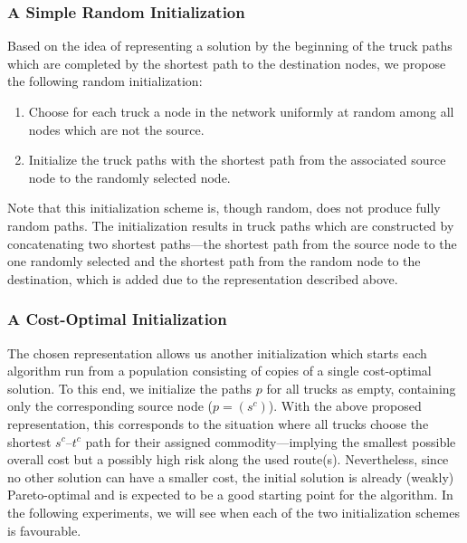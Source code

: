 \documentclass[preprint,12pt]{elsarticle}
\begin{document}
\subsubsection{A Simple Random Initialization}
Based on the idea of representing a solution by the beginning of the truck paths which are completed by the shortest path to the destination nodes, we propose the following random initialization:
\begin{enumerate}
	\item Choose for each truck a node in the network uniformly at random among all nodes which are not the source.
	\item Initialize the truck paths with the shortest path from the associated source node to the randomly selected node.
\end{enumerate}
Note that this initialization scheme is, though random, does not produce fully random paths. The initialization results in truck paths which are constructed by concatenating two shortest paths---the shortest path from the source node to the one randomly selected and the shortest path from the random node to the destination, which is added due to the representation described above.

\subsubsection{A Cost-Optimal Initialization}
The chosen representation allows us another initialization which starts each algorithm run from a population consisting of copies of a single cost-optimal solution. To this end, we initialize the paths $p$ for all trucks as empty, containing only the corresponding source node ($p=(s^c)$). With the above proposed representation, this corresponds to the situation where all trucks choose the shortest $s^c$--$t^c$ path for their assigned commodity---implying the smallest possible overall cost but a possibly high risk along the used route(s). Nevertheless, since no other solution can have a smaller cost, the initial solution is already (weakly) Pareto-optimal and is expected to be a good starting point for the algorithm. In the following experiments, we will see when each of the two initialization schemes is favourable.
\end{document}
